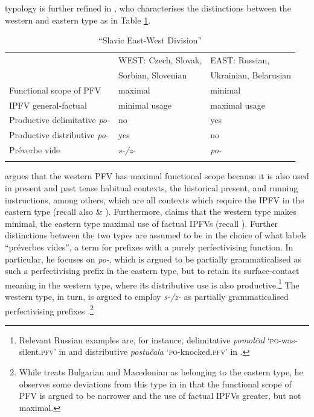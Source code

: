 \documentclass[output=paper,colorlinks,citecolor=brown]{langscibook}
\begin{document}
 typology is further refined in \citet{dickey15}%
, who characterises the distinctions between the western and eastern type as in Table \ref{tab:xslavEASTWEST}. 

\begin{table}
\caption{``Slavic East-West Division'' \citep[adapted from][]{dickey15}}
\label{tab:xslavEASTWEST}
 \begin{tabular}{lll}
 	  \lsptoprule
			&\textsc{WEST}: Czech, Slovak, &\textsc{EAST}: Russian,   \\ 
   			&Sorbian, Slovenian & Ukrainian, Belarusian  \\ \midrule [0.25ex] 
	Functional scope of PFV & maximal & minimal \\[0.25ex]
    IPFV general-factual & minimal usage & maximal usage \\[0.25ex]
    Productive delimitative \textit{po-} & no & yes\\[0.25ex]
    Productive distributive \textit{po-} & yes & no\\[0.25ex]
    Préverbe vide  & \textit{s-/z-} & \textit{po-}\\
        \lspbottomrule
 \end{tabular}
\end{table}

\citet{dickey15} argues that the western PFV has maximal functional scope because it is also used in present and past tense habitual contexts, the historical present, and running instructions, among others, which are all contexts which require the IPFV in the eastern type (recall also  \& ). Furthermore, \citeauthor{dickey15} claims that the western type makes minimal, the eastern type maximal use of factual IPFVs (recall ). Further distinctions between the two types are assumed to be in the choice of what \citeauthor{dickey15} labels ``préverbes vides'', a term for prefixes with a purely perfectivising function. In particular, he focuses on \textit{po-}, which is argued to be partially grammaticalised as such a perfectivising prefix in the eastern type, but to retain its surface-contact meaning in the western type, where its distributive use is also productive.\footnote{Relevant Russian examples are, for instance, delimitative \textit{pomolčal} `\textsc{po}-was-silent.\textsc{pfv}' in  and distributive \textit{po\-stu\-ča\-la} `\textsc{po}-knocked.\textsc{pfv}' in . %
} The western type, in turn, is argued to employ \textit{s-/z-} as partially grammaticalised perfectivising prefixes \citep[on variation with \textit{po-} and \textit{s-/z-} see also][]{dickeyhutch, dickey05, dickey11}.\footnote{While \citet{Dickey2000} treats Bulgarian and Macedonian as belonging to the eastern type, he observes some deviations from this type in \citet{dickey15} in that the functional scope of PFV is argued to be narrower and the use of factual IPFVs greater, but not maximal.} 
\end{document}
